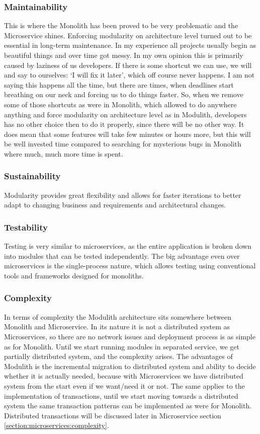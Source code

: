 \subsubsection{Maintainability}
This is where the Monolith has been proved to be very problematic and the Microservice shines. Enforcing modularity on architecture level turned out to be essential in long-term maintenance. In my experience all projects usually begin as beautiful things and over time got messy. In my own opinion this is primarily caused by laziness of us developers. If there is some shortcut we can use, we will and say to ourselves: `I will fix it later', which off course never happens. I am not saying this happens all the time, but there are times, when deadlines start breathing on our neck and forcing us to do things faster. So, when we remove some of those shortcuts as were in Monolith, which allowed to do anywhere anything and force modularity on architecture level as in Modulith, developers has no other choice then to do it properly, since there will be no other way. It does mean that some features will take few minutes or hours more, but this will be well invested time compared to searching for mysterious bugs in Monolith where much, much more time is spent.

\subsubsection{Sustainability}
Modularity provides great flexibility and allows for faster iterations to better adapt to changing business and
requirements and architectural changes.

\subsubsection{Testability}
Testing is very similar to microservices, as the entire application is broken down into modules that can be tested independently. The big advantage even over microservices is the single-process nature, which allows testing using conventional tools and frameworks designed for monoliths.

\subsubsection{Complexity}
In terms of complexity the Modulith architecture sits somewhere between Monolith and Microservice. In its nature it is not a distributed system as Microservices, so there are no network issues and deployment process is as simple as for Monolith. Until we start running modules in separated service, we get partially distributed system, and the complexity arises. The advantages of Modulith is the incremental migration to distributed system and ability to decide whether it is actually needed, because with Microservices we have distributed system from the start even if we want/need it or not. The same applies to the implementation of transactions, until we start moving towards a distributed system the same transaction patterns can be implemented as were for Monolith. Distributed transactions will be discussed later in Microservice section \ref{section:microservices:complexity}.